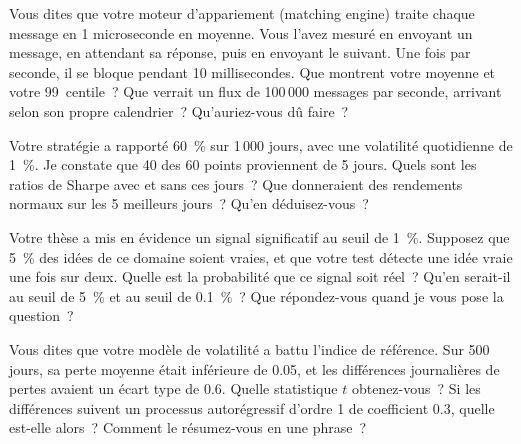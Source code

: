 \begin{question}\label{iq:iv2:your-strategy-and-your-project:16}
Vous dites que votre moteur d'appariement (matching engine) traite chaque message en 1 microseconde en moyenne. Vous l'avez mesuré en envoyant un message, en attendant sa réponse, puis en envoyant le suivant. Une fois par seconde, il se bloque pendant 10 millisecondes. Que montrent votre moyenne et votre 99~centile~? Que verrait un flux de 100\,000 messages par seconde, arrivant selon son propre calendrier~? Qu'auriez-vous dû faire~?
\end{question}

\begin{question}\label{iq:iv2:your-strategy-and-your-project:17}
Votre stratégie a rapporté 60~\% sur 1\,000 jours, avec une volatilité quotidienne de 1~\%. Je constate que 40 des 60 points proviennent de 5 jours. Quels sont les ratios de Sharpe avec et sans ces jours~? Que donneraient des rendements normaux sur les 5 meilleurs jours~? Qu'en déduisez-vous~?
\end{question}

\begin{question}\label{iq:iv2:your-strategy-and-your-project:18}
Votre thèse a mis en évidence un signal significatif au seuil de 1~\%. Supposez que 5~\% des idées de ce domaine soient vraies, et que votre test détecte une idée vraie une fois sur deux. Quelle est la probabilité que ce signal soit réel~? Qu'en serait-il au seuil de 5~\% et au seuil de 0.1~\%~? Que répondez-vous quand je vous pose la question~?
\end{question}

\begin{question}\label{iq:iv2:your-strategy-and-your-project:19}
Vous dites que votre modèle de volatilité a battu l'indice de référence. Sur 500 jours, sa perte moyenne était inférieure de 0.05, et les différences journalières de pertes avaient un écart type de 0.6. Quelle statistique $t$ obtenez-vous~? Si les différences suivent un processus autorégressif d'ordre 1 de coefficient 0.3, quelle est-elle alors~? Comment le résumez-vous en une phrase~?
\end{question}

